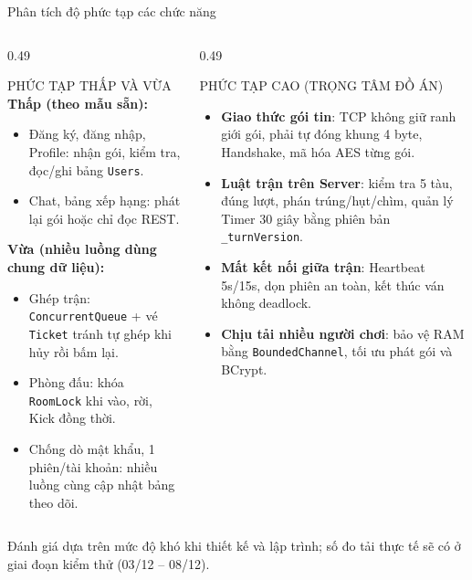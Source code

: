 \documentclass[aspectratio=169,9pt]{beamer}
\newenvironment{haicot}[1]{\begin{columns}[T,onlytextwidth]\begin{column}{#1\textwidth}}{\end{column}\end{columns}}
\newcommand{\sang}[1]{\end{column}\begin{column}{#1\textwidth}}
\begin{document}
\begin{frame}[t,label=phuctap]{Phân tích độ phức tạp các chức năng}
  \begin{haicot}{0.49}
    \begin{khung}[equal height group=pt]{PHỨC TẠP THẤP VÀ VỪA}
      \textbf{Thấp (theo mẫu sẵn):}
      \begin{itemize}\setlength{\itemsep}{1pt}
        \item Đăng ký, đăng nhập, Profile: nhận gói, kiểm tra, đọc/ghi bảng \texttt{Users}.
        \item Chat, bảng xếp hạng: phát lại gói hoặc chỉ đọc REST.
      \end{itemize}
      \textbf{Vừa (nhiều luồng dùng chung dữ liệu):}
      \begin{itemize}\setlength{\itemsep}{1pt}
        \item Ghép trận: \texttt{ConcurrentQueue} + vé \texttt{Ticket} tránh tự ghép khi hủy rồi bấm lại.
        \item Phòng đấu: khóa \texttt{RoomLock} khi vào, rời, Kick đồng thời.
        \item Chống dò mật khẩu, 1 phiên/tài khoản: nhiều luồng cùng cập nhật bảng theo dõi.
      \end{itemize}
    \end{khung}
  \sang{0.49}
    \begin{luuy}[equal height group=pt]{PHỨC TẠP CAO (TRỌNG TÂM ĐỒ ÁN)}
      \begin{itemize}\setlength{\itemsep}{1.5pt}
        \item \textbf{Giao thức gói tin}: TCP không giữ ranh giới gói, phải tự đóng khung 4 byte, Handshake, mã hóa AES từng gói.
        \item \textbf{Luật trận trên Server}: kiểm tra 5 tàu, đúng lượt, phán trúng/hụt/chìm, quản lý Timer 30 giây bằng phiên bản \texttt{\_turnVersion}.
        \item \textbf{Mất kết nối giữa trận}: Heartbeat 5s/15s, dọn phiên an toàn, kết thúc ván không deadlock.
        \item \textbf{Chịu tải nhiều người chơi}: bảo vệ RAM bằng \texttt{BoundedChannel}, tối ưu phát gói và BCrypt.
      \end{itemize}
    \end{luuy}
  \end{haicot}
  \vspace{0.05cm}\scriptsize Đánh giá dựa trên mức độ khó khi thiết kế và lập trình; số đo tải thực tế sẽ có ở giai đoạn kiểm thử (03/12 -- 08/12).
\end{frame}
\end{document}
